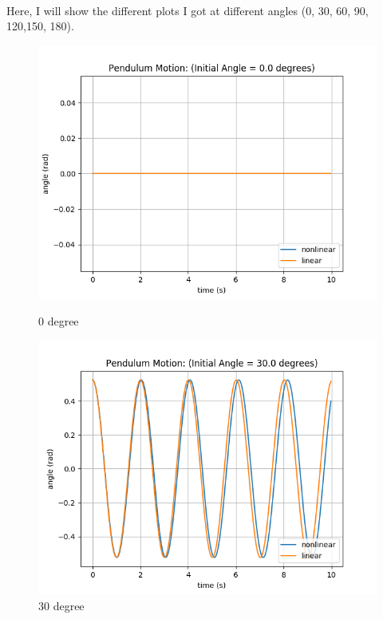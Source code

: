 \documentclass{article}
\begin{document}
\paragraph{}Here, I will show the different plots I got at different angles (0, 30, 60, 90, 120,150, 180).
\begin{figure}[h]
    \begin{minipage}{0.45\textwidth}
        \centering
        \includegraphics[width=1.2\textwidth]{Figure_0.png} %
        \caption{0 degree}
    \end{minipage}\hfill
    \begin{minipage}{0.45\textwidth}
        \centering
        \includegraphics[width=1.2\textwidth]{Figure_30.png} %
        \caption{30 degree}
    \end{minipage}
\end{figure}
\end{document}
